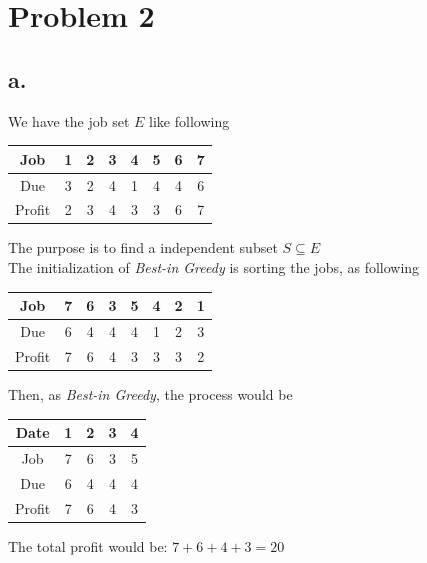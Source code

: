 \documentclass{article}
\begin{document}
\section*{Problem 2}{
    \subsection*{a.}{
        We have the job set \(\mathit{E}\) like following
        \begin{center}{
            \begin{tabular}{|c|c|c|c|c|c|c|c|}
            \hline
            Job & 1 & 2 & 3 & 4 & 5 & 6 & 7 \\
            \hline
            Due & 3 & 2 & 4 & 1 & 4 & 4 & 6 \\
            \hline
            Profit & 2 & 3 & 4 & 3 & 3 & 6 & 7 \\
            \hline
            \end{tabular}
        }
        \end{center} 
        The purpose is to find a independent subset \(\mathit{S} \subseteq \mathit{E}\)\\
        The initialization of \textit{Best-in Greedy} is sorting the jobs, as following
        \begin{center}{
            \begin{tabular}{|c|c|c|c|c|c|c|c|}
            \hline
            Job & 7 & 6 & 3 & 5 & 4 & 2 & 1 \\
            \hline
            Due & 6 & 4 & 4 & 4 & 1 & 2 & 3 \\
            \hline
            Profit & 7 & 6 & 4 & 3 & 3 & 3 & 2 \\
            \hline
            \end{tabular}
        }
        \end{center} 
        Then, as \textit{Best-in Greedy}, the process would be
        \begin{center}{
            \begin{tabular}{|c|c|c|c|c|}
            \hline
            Date & 1 & 2 & 3 & 4 \\
            \hline
            Job & 7 & 6 & 3 & 5 \\
            \hline
            Due & 6 & 4 & 4 & 4 \\
            \hline
            Profit & 7 & 6 & 4 & 3 \\
            \hline
            \end{tabular}
        }
        \end{center}
        The total profit would be: \(\mathrm{7+6+4+3=20}\)
    }
}
\end{document}
